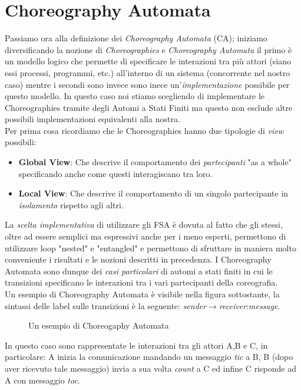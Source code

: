\section{Choreography Automata}
Passiamo ora alla definizione dei \emph{Choreography Automata} (CA); iniziamo diversificando la nozione di \emph{Choreographies} e \emph{Choreography Automata} il primo è un modello logico che permette di specificare le interazioni tra più attori (siano essi processi, programmi, etc.) all'interno di un sistema (concorrente nel nostro caso) mentre i secondi sono invece sono inece un'\emph{implementazione} possibile per questo modello. In questo caso noi stiamo scegliendo di implementare le Choreographies tramite degli Automi a Stati Finiti ma questo non esclude altre possibili implementazioni equivalenti alla nostra.\\
Per prima cosa ricordiamo che le Choreographies hanno due tipologie di \emph{view} possibili:
\begin{itemize}
    \item \textbf{Global View}: Che descrive il comportamento dei \emph{partecipanti} "as a whole" specificando anche come questi interagiscano tra loro.
    \item \textbf{Local View}: Che descrive il comportamento di un singolo partecipante in \emph{isolamento} rispetto agli altri.
\end{itemize}
La \emph{scelta implementativa} di utilizzare gli FSA è dovuta al fatto che gli stessi, oltre ad essere semplici ma espressivi anche per i meno esperti, permettono di utilizzare loop "nested" e "entangled" e permettono di sfruttare in maniera molto conveniente i risultati e le nozioni descritti in precedenza. I Choreography Automata sono dunque dei \emph{casi particolari} di automi a stati finiti in cui le transizioni specificano le interazioni tra i vari partecipanti della coreografia.\\ %
Un esempio di Choreography Automata è visibile nella figura sottostante, la sintassi delle label sulle transizioni è la seguente: \emph{sender}$\rightarrow$\emph{receiver}:\emph{message}.
\newpage
\begin{figure}
    \centering
    \caption{Un esempio di Choreogaphy Automata}
    \label{fig:Example CA}
\end{figure}
In questo caso sono rappresentate le interazioni tra gli attori A,B e C, in particolare: A inizia la comunicazione mandando un messaggio \emph{tic} a B, B (dopo aver ricevuto tale messaggio) invia a sua volta \emph{count} a C ed infine C risponde ad A con messaggio \emph{toc}.

